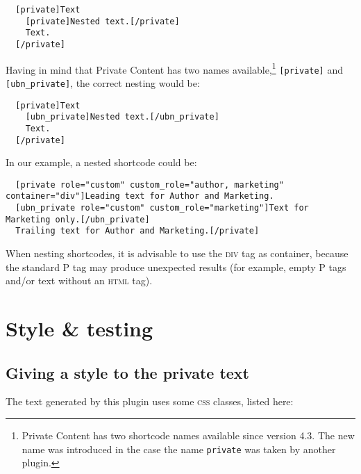 \begin{lstlisting}
  [private]Text
    [private]Nested text.[/private]
    Text.
  [/private]
\end{lstlisting}

Having in mind that Private Content has two names available,\footnote{Private
Content has two shortcode names available since version 4.3. The new name was
introduced in the case the name \texttt{private} was taken by another plugin.}
\texttt{[private]} and \texttt{[ubn\_private]}, the correct nesting would be:

\begin{lstlisting}
  [private]Text
    [ubn_private]Nested text.[/ubn_private]
    Text.
  [/private]
\end{lstlisting}

In our example, a nested shortcode could be:

\begin{lstlisting}
  [private role="custom" custom_role="author, marketing" container="div"]Leading text for Author and Marketing.
  [ubn_private role="custom" custom_role="marketing"]Text for Marketing only.[/ubn_private]
  Trailing text for Author and Marketing.[/private]
\end{lstlisting}

When nesting shortcodes,  it is advisable to use the \textsc{div} tag as container, because
the standard P tag may produce unexpected results (for example, empty P tags
and/or text without an \textsc{html} tag).

\part{Style \& testing}

\chapter{Giving a style to the private text}

The text generated by this plugin uses some \textsc{css} classes, listed here:

